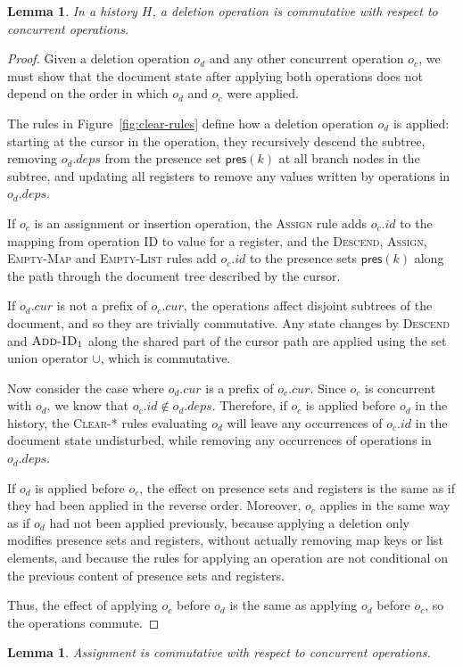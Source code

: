 \documentclass[10pt,journal,compsoc]{IEEEtran}
\newtheorem{lemma}[theorem]{Lemma}
\begin{document}
\begin{lemma}\label{lem:delete-commute}
In a history $H$, a deletion operation is commutative with respect to concurrent operations.
\end{lemma}

\begin{proof}
Given a deletion operation $o_d$ and any other concurrent operation $o_c$, we must show that the document state after applying both operations does not depend on the order in which $o_d$ and $o_c$ were applied.

The rules in Figure~\ref{fig:clear-rules} define how a deletion operation $o_d$ is applied: starting at the cursor in the operation, they recursively descend the subtree, removing $o_d.\mathit{deps}$ from the presence set $\mathsf{pres}(k)$ at all branch nodes in the subtree, and updating all registers to remove any values written by operations in $o_d.\mathit{deps}$.

If $o_c$ is an assignment or insertion operation, the \textsc{Assign} rule adds $o_c.\mathit{id}$ to the mapping from operation ID to value for a register, and the \textsc{Descend}, \textsc{Assign}, \textsc{Empty-Map} and \textsc{Empty-List} rules add $o_c.\mathit{id}$ to the presence sets $\mathsf{pres}(k)$ along the path through the document tree described by the cursor.

If $o_d.\mathit{cur}$ is not a prefix of $o_c.\mathit{cur}$, the operations affect disjoint subtrees of the document, and so they are trivially commutative. Any state changes by \textsc{Descend} and $\textsc{Add-ID}_1$ along the shared part of the cursor path are applied using the set union operator $\cup$, which is commutative.

Now consider the case where $o_d.\mathit{cur}$ is a prefix of $o_c.\mathit{cur}$. Since $o_c$ is concurrent with $o_d$, we know that $o_c.\mathit{id} \notin o_d.\mathit{deps}$. Therefore, if $o_c$ is applied before $o_d$ in the history, the \textsc{Clear-*} rules evaluating $o_d$ will leave any occurrences of $o_c.\mathit{id}$ in the document state undisturbed, while removing any occurrences of operations in $o_d.\mathit{deps}$.

If $o_d$ is applied before $o_c$, the effect on presence sets and registers is the same as if they had been applied in the reverse order. Moreover, $o_c$ applies in the same way as if $o_d$ had not been applied previously, because applying a deletion only modifies presence sets and registers, without actually removing map keys or list elements, and because the rules for applying an operation are not conditional on the previous content of presence sets and registers.

Thus, the effect of applying $o_c$ before $o_d$ is the same as applying $o_d$ before $o_c$, so the operations commute.
\end{proof}

\begin{lemma}\label{lem:assign-commute}
Assignment is commutative with respect to concurrent operations.
\end{lemma}

\fi %
\end{document}
